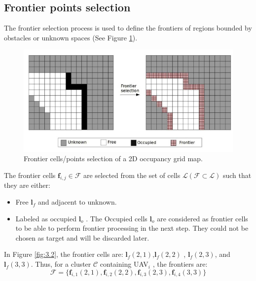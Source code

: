 \documentclass[11pt,openany]{book}
\begin{document}
\subsection{Frontier points selection}
The frontier selection process is used to define the frontiers of regions bounded by obstacles or unknown spaces (See Figure \ref{fig:3.3}).
\begin{figure}[H]
    \centering
    \includegraphics[scale=0.4]{assets/3_3.png}
    \caption{Frontier cells/points selection of a 2D occupancy grid map.}
    \label{fig:3.3}
\end{figure}
The frontier cells $\mathbf{f}_{i,j} \in \mathcal{F}$ are selected from the set of cells $\mathcal{L}(\mathcal{F}\subset \mathcal{L})$ such that they are either:
\begin{itemize}
    \item Free $\mathbf{l}_f$ and adjacent to unknown.
    \item Labeled as occupied $\mathbf{l}_o$ . The Occupied cells $\mathbf{l}_o$ are considered as frontier cells to be able to perform frontier processing in the next step. They could not be chosen as target and will be discarded later.
\end{itemize}
In Figure \ref{fig:3.2}, the frontier cells are: $\mathbf{l}_f(2,1)$,$\mathbf{l}_f(2,2)$ , $\mathbf{l}_f(2,3)$, and $\mathbf{l}_f(3,3)$. Thus, for a cluster $\mathcal{C}$ containing UAV$_i$ , the frontiers are:
\begin{equation} \label{eq:3.1}
    \mathcal{F}=\{\mathbf{f}_{i,1}(2,1),\mathbf{f}_{i,2}(2,2),\mathbf{f}_{i,3}(2,3),\mathbf{f}_{i,4}(3,3)\}
\end{equation}
\end{document}
